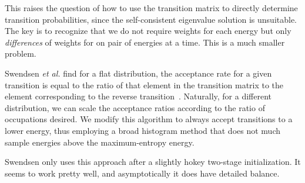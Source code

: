 \documentclass[letterpaper,twocolumn,amsmath,amssymb,pre,aps,10pt]{revtex4-1}
\begin{document}
This raises the question of how to use the transition matrix to
directly determine transition probabilities, since the self-consistent
eigenvalue solution is unsuitable.  The key is to recognize that we do
not require weights for each energy but only \emph{differences} of
weights for on pair of energies at a time.  This is a much smaller
problem.

Swendsen \emph{et al.} find for a flat distribution, the acceptance
rate for a given transition is equal to the ratio of that element in
the transition matrix to the element corresponding to the reverse
transition~\cite{swendsen1999transition}.  Naturally, for a different
distribution, we can scale the acceptance ratios according to the
ratio of occupations desired.  We modify this algorithm to always
accept transitions to a lower energy, thus employing a broad histogram
method that does not much sample energies above the maximum-entropy
energy.

Swendsen only uses this approach after a slightly hokey two-stage
initialization.  It seems to work pretty well, and asymptotically it
does have detailed balance.

\newpage


\end{document}
